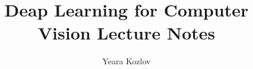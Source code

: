 \graphicspath{{deep_learning/deep_learning/}}




\title{Deap Learning for Computer Vision Lecture Notes}
\author{Yeara Kozlov}
\date{}

\maketitle

\tableofcontents
\cleardoublepage




